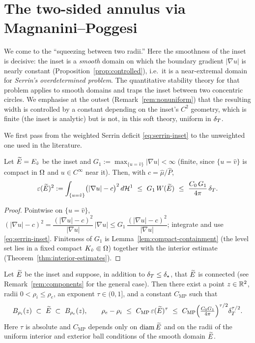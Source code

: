 \section{The two-sided annulus via Magnanini--Poggesi}\label{sec:trapping}

We come to the ``squeezing between two radii.'' Here the smoothness of the
inset is decisive: the inset is a \emph{smooth} domain on which the boundary
gradient $|\nabla u|$ is nearly constant
(Proposition~\ref{prop:controlled}), i.e.\ it is a near-extremal domain for
\emph{Serrin's overdetermined problem}. The quantitative stability theory
for that problem applies to smooth domains and traps the inset between two
concentric circles. We emphasise at the outset (Remark~\ref{rem:nonuniform})
that the resulting width is controlled by a constant depending on the
inset's $C^2$ geometry, which is finite (the inset is analytic) but is not,
in this soft theory, uniform in $\delta_T$.

We first pass from the weighted Serrin deficit \eqref{eq:serrin-inset} to
the unweighted one used in the literature.

\begin{lemma}\label{lem:unweighted}
Let $\widetilde E=E_{\hat v}$ be the inset and
$G_1:=\max_{\{u=\hat v\}}|\nabla u|<\infty$ (finite, since $\{u=\hat v\}$ is
compact in $\Omega$ and $u\in C^\infty$ near it). Then, with $c=\hat\mu/\hat P$,
\begin{equation}\label{eq:unweighted}
   \varepsilon(\widetilde E)^2:=\int_{\{u=\hat v\}}\bigl(|\nabla u|-c\bigr)^2\,d\mathcal{H}^1
   \ \le\ G_1\,W(\widetilde E)\ \le\ \frac{C_0\,G_1}{4\pi}\,\delta_T .
\end{equation}
\end{lemma}

\begin{proof}
Pointwise on $\{u=\hat v\}$, $(|\nabla u|-c)^2=\dfrac{(|\nabla
u|-c)^2}{|\nabla u|}\,|\nabla u|\le G_1\,\dfrac{(|\nabla u|-c)^2}{|\nabla
u|}$; integrate and use \eqref{eq:serrin-inset}. Finiteness of $G_1$ is
Lemma~\ref{lem:compact-containment} (the level set lies in a fixed compact
$K_{\hat v}\Subset\Omega$) together with the interior estimate
(Theorem~\ref{thm:interior-estimates}).
\end{proof}

\begin{theorem}\label{thm:annulus}
Let $\widetilde E$ be the inset and suppose, in addition to $\delta_T\le\delta_\star$,
that $\widetilde E$ is connected \textup{(}see Remark~\ref{rem:components} for the
general case\textup{)}. Then there exist a point $z\in\mathbb{R}^2$, radii
$0<\rho_i\le\rho_e$, an exponent $\tau\in(0,1]$, and a constant
$C_{\mathrm{MP}}$ such that
\begin{equation}\label{eq:annulus}
   B_{\rho_i}(z)\ \subset\ \Etil\ \subset\ B_{\rho_e}(z),
   \qquad
   \rho_e-\rho_i\ \le\ C_{\mathrm{MP}}\,\eps(\Etil)^{\tau}
   \ \le\ C_{\mathrm{MP}}\Bigl(\tfrac{C_0G_1}{4\pi}\Bigr)^{\tau/2}\dT^{\tau/2}.
\end{equation}
Here $\tau$ is absolute and $C_{\mathrm{MP}}$ depends only on
$\operatorname{diam}\widetilde E$ and on the radii of the uniform interior and
exterior ball conditions of the smooth domain $\widetilde E$.
\end{theorem}


